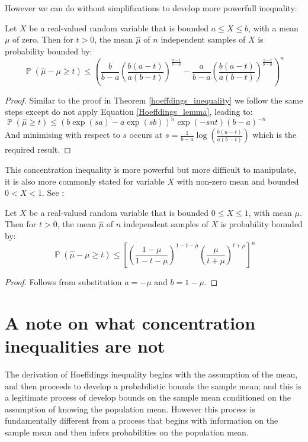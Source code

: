 \documentclass[12pt]{colt2020} %
\DeclareMathOperator{\p}{\mathbb{P}}
\begin{document}
However we can do without simplifications to develop more powerfull inequality:

\begin{theorem}\label{hoeffdings_inequality22}
Let $X$ be a real-valued random variable that is bounded $a\le X\le b$, with a mean $\mu$ of zero.  Then for $t>0$, the mean $\hat{\mu}$ of $n$ independent samples of $X$ is probability bounded by:
\begin{equation}\p(\hat{\mu}-\mu\ge t)\le \left( \frac{b}{b-a}\left(\frac{b(a-t)}{a(b-t)}\right)^{\frac{a-t}{b-a}} -\frac{a}{b-a}\left(\frac{b(a-t)}{a(b-t)}\right)^{\frac{b-t}{b-a}}  \right)^n
\end{equation}
\end{theorem}
\begin{proof}
Similar to the proof in Theorem \ref{hoeffdings_inequality} we follow the same steps except do not apply Equation \ref{Hoeffdings_lemma}, leading to:
$ \p(\hat{\mu}\ge t) \le (b\exp(sa) - a\exp(sb))^n\exp(-snt)(b-a)^{-n} $\\
And minimising with respect to $s$ occurs at
$ s = \frac{1}{b-a}\log\left(\frac{b(a - t)}{a(b - t)}\right) $
which is the required result.
\end{proof}
This concentration inequality is more powerful but more difficult to manipulate, it is also more commonly stated for variable $X$ with non-zero mean and bounded $0<X<1$. See \cite{CHVATAL1979285, 10.2307/2282952}:

\begin{theorem}\label{hoeffdings_inequality23}
Let $X$ be a real-valued random variable that is bounded $0\le X\le 1$, with mean $\mu$. Then for $t>0$, the mean $\hat{\mu}$ of $n$ independent samples of $X$ is probability bounded by:
\begin{equation}\p(\hat{\mu}-\mu\ge t)\le \left[\left(\frac{1-\mu}{1-t-\mu}\right)^{1-t-\mu}  \left(\frac{\mu}{t+\mu}\right)^{t+\mu}\right]^n
\end{equation}
\end{theorem}
\begin{proof}
Follows from substitution $a=-\mu$ and $b=1-\mu$.
\end{proof}

\section{A note on what concentration inequalities are not}\label{appendix:are_not}

The derivation of Hoeffdings inequality begins with the assumption of the mean, and then proceeds to develop a probabilistic bounds the sample mean; and this is a legitimate process of develop bounds on the sample mean conditioned on the assumption of knowing the population mean.
However this process is fundamentally different from a process that begins with information on the sample mean and then infers probabilities on the population mean.
\end{document}
